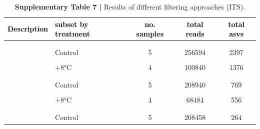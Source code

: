 \documentclass[
  10pt,
  letterpaper,
  DIV=11,
  numbers=noendperiod]{scrartcl}
\begin{document}
\begin{table}[H]

\caption{\textbf{Supplementary Table 7 |} Results of different filtering approaches (ITS).}
\centering
\fontsize{8}{10}\selectfont
\begin{tabular}[t]{llccc}
\toprule
\textcolor{black}{\textbf{Description}} & \textcolor{black}{\textbf{subset by treatment}} & \textcolor{black}{\textbf{no. samples}} & \textcolor{black}{\textbf{total reads}} & \textcolor{black}{\textbf{total asvs}}\\
\midrule
\addlinespace[-0.3em]
\multicolumn{5}{l}{\textbf{}}\\
\hspace{1em}\cellcolor{gray!6}{FULL data set} & \cellcolor{gray!6}{} & \cellcolor{gray!6}{13} & \cellcolor{gray!6}{490767} & \cellcolor{gray!6}{3355}\\
\hspace{1em} & Control & 5 & 256594 & 2397\\
\hspace{1em}\cellcolor{gray!6}{} & \cellcolor{gray!6}{+3°C} & \cellcolor{gray!6}{4} & \cellcolor{gray!6}{133333} & \cellcolor{gray!6}{1998}\\
\hspace{1em} & +8°C & 4 & 100840 & 1376\\
\addlinespace[-0.3em]
\multicolumn{5}{l}{\textbf{}}\\
\hspace{1em}\cellcolor{gray!6}{Arbitrary filter} & \cellcolor{gray!6}{} & \cellcolor{gray!6}{13} & \cellcolor{gray!6}{385643} & \cellcolor{gray!6}{816}\\
\hspace{1em} & Control & 5 & 208940 & 769\\
\hspace{1em}\cellcolor{gray!6}{} & \cellcolor{gray!6}{+3°C} & \cellcolor{gray!6}{4} & \cellcolor{gray!6}{108219} & \cellcolor{gray!6}{780}\\
\hspace{1em} & +8°C & 4 & 68484 & 556\\
\addlinespace[-0.3em]
\multicolumn{5}{l}{\textbf{}}\\
\hspace{1em}\cellcolor{gray!6}{PERFect filter} & \cellcolor{gray!6}{} & \cellcolor{gray!6}{13} & \cellcolor{gray!6}{361399} & \cellcolor{gray!6}{306}\\
\hspace{1em} & Control & 5 & 208458 & 264\\

\end{tabular}
\end{table}
\end{document}
